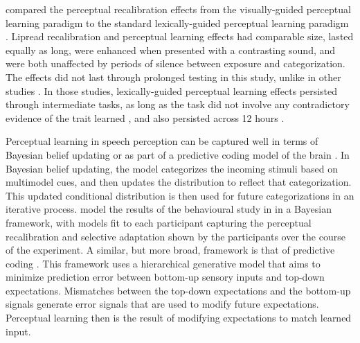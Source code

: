 \citet{vanLinden2007} compared the perceptual recalibration effects from the visually-guided perceptual learning paradigm \citep{Bertelson2003} to the standard lexically-guided perceptual learning paradigm \citep{Norris2003}.  
Lipread recalibration and perceptual learning effects had comparable size, lasted equally as long, were enhanced when presented with a contrasting sound, and were both unaffected by periods of silence between exposure and categorization.  
The effects did not last through prolonged testing in this study, unlike in other studies \citep{Kraljic2005,Eisner2006}.
In those studies, lexically-guided perceptual learning effects persisted through intermediate tasks, as long as the task did not involve any contradictory evidence of the trait learned \citep{Kraljic2005}, and also persisted across 12 hours \citep{Eisner2006}.

Perceptual learning in speech perception can be captured well in terms of Bayesian belief updating \citep{Kleinschmidt2011} or as part of a predictive coding model of the brain \citep{Clark2013}.  
In Bayesian belief updating, the model categorizes the incoming stimuli based on multimodel cues, and then updates the distribution to reflect that categorization.  
This updated conditional distribution is then used for future categorizations in an iterative process.  
\citet{Kleinschmidt2011} model the results of the behavioural study in \citet{Vroomen2007} in a Bayesian framework, with models fit to each participant capturing the perceptual recalibration and selective adaptation shown by the participants over the course of the experiment.  
A similar, but more broad, framework is that of predictive coding \citep{Clark2013}. 
This framework uses a hierarchical generative model that aims to minimize prediction error between bottom-up sensory inputs and top-down expectations.  
Mismatches between the top-down expectations and the bottom-up signals generate error signals that are used to modify future expectations.  
Perceptual learning then is the result of modifying expectations to match learned input.

